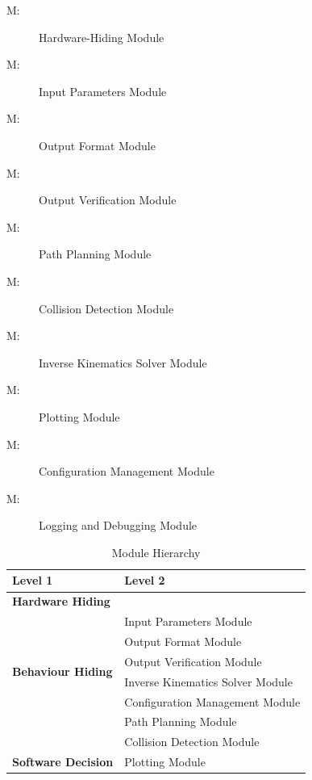 \documentclass[12pt, titlepage]{article}
\newcounter{mnum}
\newcommand{\mthemnum}{M\themnum}
\begin{document}
\begin{description}
\item [ \mthemnum \label{mHH1}:] Hardware-Hiding Module
\item [ \mthemnum \label{mHH2}:] Input Parameters Module
\item [ \mthemnum \label{mHH3}:] Output Format Module
\item [ \mthemnum \label{mHH4}:] Output Verification Module
\item [ \mthemnum \label{mHH5}:] Path Planning Module
\item [ \mthemnum \label{mHH6}:] Collision Detection Module
\item [ \mthemnum \label{mHH7}:] Inverse Kinematics Solver Module
\item [ \mthemnum \label{mHH8}:] Plotting Module
\item [ \mthemnum \label{mHH9}:] Configuration Management Module
\item [ \mthemnum \label{mHH10}:] Logging and Debugging Module

\end{description}


\begin{table}[h!]
  \centering
  \begin{tabular}{p{} p{}}
  \toprule
  \textbf{Level 1} & \textbf{Level 2}\\
  \midrule
  \textbf{Hardware Hiding} & \\ 
  \midrule
  \multirow{6}{0.3\textwidth}{\textbf{Behaviour Hiding}} 
  & Input Parameters Module \\ 
  & Output Format Module \\ 
  & Output Verification Module \\ 
  & Inverse Kinematics Solver Module \\ 
  & Configuration Management Module \\ 
  & Path Planning Module \\ 
  & Collision Detection Module \\ 
  \midrule
  \multirow{1}{0.3\textwidth}{\textbf{Software Decision}} 
  & Plotting Module \\ 
  \bottomrule
  \end{tabular}
  \caption{Module Hierarchy}
  \label{TblMH}
\end{table}
  
\end{document}
